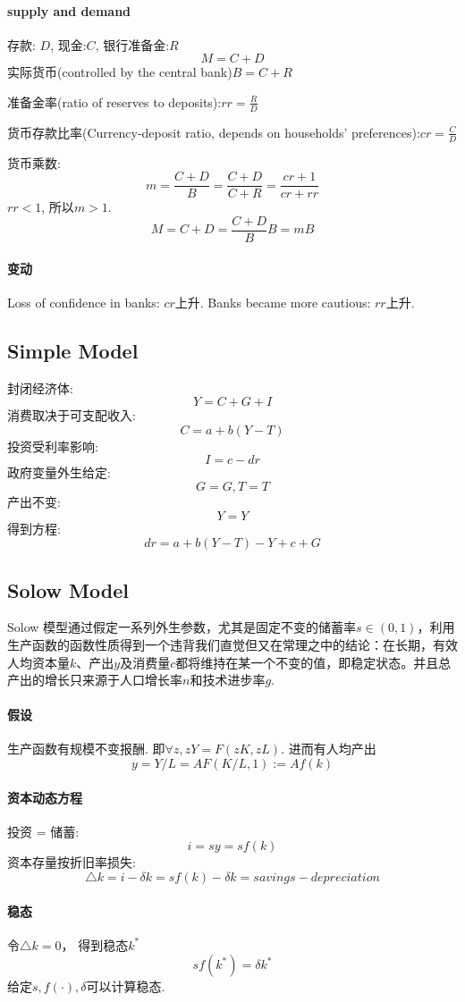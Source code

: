 \documentclass[UTF8, onecolumn, a4paper, 12pt]{article}
\begin{document}
\paragraph{supply and demand}
存款: $D$, 现金:$C$, 银行准备金:$R$
$$M = C+ D$$
实际货币(controlled by the central bank)$B = C+ R$

准备金率(ratio of reserves to deposits):$rr = \frac{R}{D}$

货币存款比率(Currency-deposit ratio, depends on households’ preferences):$cr= \frac{C}{D}$

货币乘数:$$m = \frac{C+D}{B} = \frac{C+D}{C+R} = \frac{cr+1}{cr+rr}$$
$rr<1$, 所以$m>1$.
$$M = C+D =  \frac{C+D}{B}B = m B$$
\paragraph{变动}
Loss of confidence in banks: $cr$上升.
Banks became more cautious: $rr$上升.

\subsection{Simple Model}
封闭经济体:
$$Y = C + G + I$$
消费取决于可支配收入:
$$C = a + b(Y-T)$$
投资受利率影响:
$$I = c - dr$$
政府变量外生给定:
$$G = G, T = T$$
产出不变:
$$Y = Y$$
得到方程:
$$dr = a+b(Y- T) - Y + c +G$$
\subsection{Solow Model}
Solow 模型通过假定一系列外生参数，尤其是固定不变的储蓄率$s\in (0, 1)$，利用生产函数的函数性质得到一个违背我们直觉但又在常理之中的结论：在长期，有效人均资本量$k$、产出$y$及消费量$c$都将维持在某一个不变的值，即稳定状态。并且总产出的增长只来源于人口增长率$n$和技术进步率$g$.
\paragraph{假设} 生产函数有规模不变报酬. 即$\forall z, zY = F(zK, zL)$. 进而有人均产出
$$y = Y/L = AF(K/L, 1) := Af(k)$$

\paragraph{资本动态方程}
投资 = 储蓄:
$$i = sy = sf(k)$$
资本存量按折旧率损失:
$$\triangle k = i - \delta k = sf(k) - \delta k = savings - depreciation$$
\paragraph{稳态}
令$\triangle k = 0$， 得到稳态$k^*$
$$sf(k^*) = \delta k^*$$
给定$s, f(\cdot), \delta$可以计算稳态.
\end{document}
